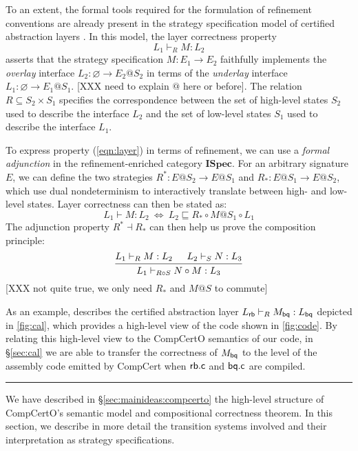 \documentclass[acmsmall,review,anonymous]{acmart}\settopmatter{printfolios=true,printccs=false,printacmref=false}
\newcommand{\ISpec}{\mathbf{ISpec}}
\begin{document}
To an extent,
the formal tools required for the formulation of refinement conventions
are already present in the strategy specification model
of certified abstraction layers \cite[\S 3.7]{rbgs-cal}.
%
In this model,
the layer correctness property
\begin{equation} \label{eqn:layer}
  L_1 \vdash_R M : L_2
\end{equation}
asserts that the strategy specification
$M : E_1 \rightarrow E_2$
faithfully implements the \emph{overlay} interface
$L_2 : \varnothing \rightarrow E_2@S_2$
in terms of the \emph{underlay} interface
$L_1 : \varnothing \rightarrow E_1@S_1$.
[XXX need to explain $@$ here or before].
The relation $R \subseteq S_2 \times S_1$
specifies the correspondence between
the set of high-level states $S_2$
used to describe the interface $L_2$
and the set of low-level states $S_1$
used to describe the interface $L_1$.

To express property (\ref{eqn:layer})
in terms of refinement,
we can use a \emph{formal adjunction}
in the refinement-enriched category $\ISpec$.
For an arbitrary signature $E$,
we can define the two strategies
$R^* : E@S_2 \rightarrow E@S_1$ and
$R_* : E@S_1 \rightarrow E@S_2$,
which use dual nondeterminism to interactively translate
between high- and low-level states.
Layer correctness can then be stated as:
\[
  L_1 \vdash M : L_2 \: \Leftrightarrow \:
  L_2 \sqsubseteq R_* \circ M@S_1 \circ L_1
\]
The adjunction property $R^* \dashv R_*$
can then help us prove the composition principle:
\[
  \begin{prooftree}
    \hypo{L_1 \vdash_R M : L_2}
    \hypo{L_2 \vdash_S N : L_3}
    \infer2{L_1 \vdash_{R \circ S} N \circ M : L_3}
  \end{prooftree}
\]
[XXX not quite true,
we only need $R_*$ and $M@S$ to commute]

As an example,
\citet{rbgs-cal} describes the certified abstraction layer
$L_{ \mathsf{rb} } \vdash_R M_{ \mathsf{bq} } : L_{ \mathsf{bq} }$
depicted in \autoref{fig:cal},
which provides a high-level view
of the code shown in \autoref{fig:code}.
By relating this high-level view
to the CompCertO semantics of our code,
in \S\ref{sec:cal} we are able to transfer
the correctness of $M_{ \mathsf{bq} }$
to the level of the assembly code emitted by CompCert
when $ \mathsf{rb.c} $ and $ \mathsf{bq.c} $ are compiled.


\hrule

We have described in \S\ref{sec:mainideas:compcerto}
the high-level structure
of CompCertO's semantic model
and compositional correctness theorem.
In this section,
we describe in more detail
the transition systems involved
and their interpretation 
as strategy specifications.
\end{document}
